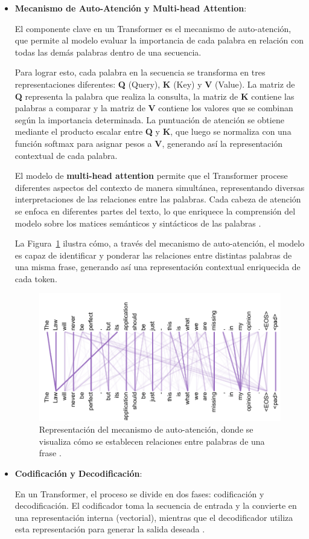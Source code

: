 \documentclass[../main.tex]{subfiles}
\begin{document}
\begin{itemize}
	\item \textbf{Mecanismo de Auto-Atención y Multi-head Attention}:
	
	El componente clave en un Transformer es el mecanismo de auto-atención, que permite al modelo evaluar la importancia de cada palabra en relación con todas las demás palabras dentro de una secuencia.
	
	Para lograr esto, cada palabra en la secuencia se transforma en tres representaciones diferentes: \textbf{Q} (Query), \textbf{K} (Key) y \textbf{V} (Value). La matriz de \textbf{Q} representa la palabra que realiza la consulta, la matriz de \textbf{K} contiene las palabras a comparar y la matriz de \textbf{V} contiene los valores que se combinan según la importancia determinada. La puntuación de atención se obtiene mediante el producto escalar entre \textbf{Q} y \textbf{K}, que luego se normaliza con una función softmax para asignar pesos a \textbf{V}, generando así la representación contextual de cada palabra.
	
	El modelo de \textbf{multi-head attention} permite que el Transformer procese diferentes aspectos del contexto de manera simultánea, representando diversas interpretaciones de las relaciones entre las palabras. Cada cabeza de atención se enfoca en diferentes partes del texto, lo que enriquece la comprensión del modelo sobre los matices semánticos y sintácticos de las palabras \parencite{chopra2013natural}.
	
	La Figura~\ref{fig:atencion} ilustra cómo, a través del mecanismo de auto-atención, el modelo es capaz de identificar y ponderar las relaciones entre distintas palabras de una misma frase, generando así una representación contextual enriquecida de cada token.
	
	\begin{figure}[H]
		\centering
		\includegraphics[width=.7\textwidth]{images/clave_valor_atencion.png}
		\caption{Representación del mecanismo de auto-atención, donde se visualiza cómo se establecen relaciones entre palabras de una frase \parencite{vaswani2017attention}.}
		\label{fig:atencion}
	\end{figure}
	
	\item \textbf{Codificación y Decodificación}:
	
	En un Transformer, el proceso se divide en dos fases: codificación y decodificación. El codificador toma la secuencia de entrada y la convierte en una representación interna (vectorial), mientras que el decodificador utiliza esta representación para generar la salida deseada \parencite{vaswani2017attention}.
	
	
\end{itemize}
\end{document}
